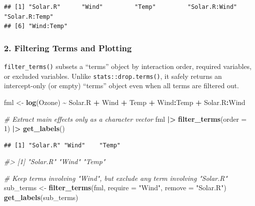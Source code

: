 \documentclass[
]{article}
\newenvironment{Shaded}{\begin{snugshade}}{\end{snugshade}}
\newcommand{\AttributeTok}[1]{\textcolor[rgb]{0.13,0.29,0.53}{#1}}
\newcommand{\CommentTok}[1]{\textcolor[rgb]{0.56,0.35,0.01}{\textit{#1}}}
\newcommand{\DecValTok}[1]{\textcolor[rgb]{0.00,0.00,0.81}{#1}}
\newcommand{\FunctionTok}[1]{\textcolor[rgb]{0.13,0.29,0.53}{\textbf{#1}}}
\newcommand{\NormalTok}[1]{#1}
\newcommand{\OtherTok}[1]{\textcolor[rgb]{0.56,0.35,0.01}{#1}}
\newcommand{\SpecialCharTok}[1]{\textcolor[rgb]{0.81,0.36,0.00}{\textbf{#1}}}
\newcommand{\StringTok}[1]{\textcolor[rgb]{0.31,0.60,0.02}{#1}}
\begin{document}
\begin{verbatim}
## [1] "Solar.R"      "Wind"         "Temp"         "Solar.R:Wind" "Solar.R:Temp"
## [6] "Wind:Temp"
\end{verbatim}

\subsubsection{2. Filtering Terms and
Plotting}\label{filtering-terms-and-plotting}

\texttt{filter\_terms()} subsets a ``terms'' object by interaction
order, required variables, or excluded variables. Unlike
\texttt{stats::drop.terms()}, it safely returns an intercept-only (or
empty) ``terms'' object even when all terms are filtered out.

\begin{Shaded}
\begin{Highlighting}[]
\NormalTok{fml }\OtherTok{\textless{}{-}} \FunctionTok{log}\NormalTok{(Ozone) }\SpecialCharTok{\textasciitilde{}}\NormalTok{ Solar.R }\SpecialCharTok{+}\NormalTok{ Wind }\SpecialCharTok{+}\NormalTok{ Temp }\SpecialCharTok{+}\NormalTok{ Wind}\SpecialCharTok{:}\NormalTok{Temp }\SpecialCharTok{+}\NormalTok{ Solar.R}\SpecialCharTok{:}\NormalTok{Wind}

\CommentTok{\# Extract main effects only as a character vector}
\NormalTok{fml }\SpecialCharTok{|\textgreater{}} \FunctionTok{filter\_terms}\NormalTok{(}\AttributeTok{order =} \DecValTok{1}\NormalTok{) }\SpecialCharTok{|\textgreater{}} \FunctionTok{get\_labels}\NormalTok{()}
\end{Highlighting}
\end{Shaded}

\begin{verbatim}
## [1] "Solar.R" "Wind"    "Temp"
\end{verbatim}

\begin{Shaded}
\begin{Highlighting}[]
\CommentTok{\#\textgreater{} [1] "Solar.R" "Wind"    "Temp"}

\CommentTok{\# Keep terms involving "Wind", but exclude any term involving "Solar.R"}
\NormalTok{sub\_terms }\OtherTok{\textless{}{-}} \FunctionTok{filter\_terms}\NormalTok{(fml, }\AttributeTok{require =} \StringTok{"Wind"}\NormalTok{, }\AttributeTok{remove =} \StringTok{"Solar.R"}\NormalTok{)}
\FunctionTok{get\_labels}\NormalTok{(sub\_terms)}
\end{Highlighting}
\end{Shaded}
\end{document}

